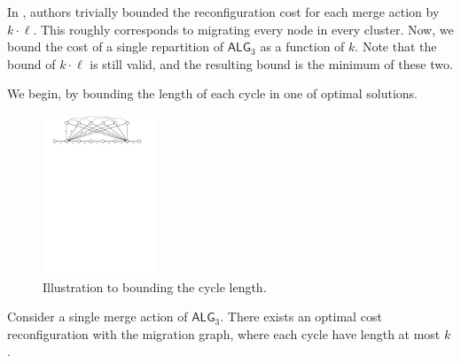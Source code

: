 \documentclass[manuscript,screen=true, review, anonymous]{acmart}
\newcommand{\TAlg}{{\ensuremath{\textsf{ALG}_{3}}}\xspace}
\begin{document}
In \cite{repartition-disc}, authors trivially bounded the reconfiguration cost for each merge action by $k \cdot \ell$.
This roughly corresponds to migrating every node in every cluster.
Now, we bound the cost of a single repartition of \TAlg as a function of $k$.
Note that the bound of $k \cdot \ell$ is still valid, and the resulting bound is the minimum of these two.

We begin, by bounding the length of each cycle in one of optimal solutions.


\begin{figure}[H]
	\centering
	\includegraphics[width=0.3\textwidth]{figs/substitute}
	\caption{Illustration to bounding the cycle length.}
	\label{fig:cascade-illustration}
\end{figure}

\begin{theorem}
	\label{th:cascade-cycles}
	Consider a single merge action of \TAlg.
	There exists an optimal cost reconfiguration with the migration graph, where each cycle have length at most $k$.
\end{theorem}
\end{document}
